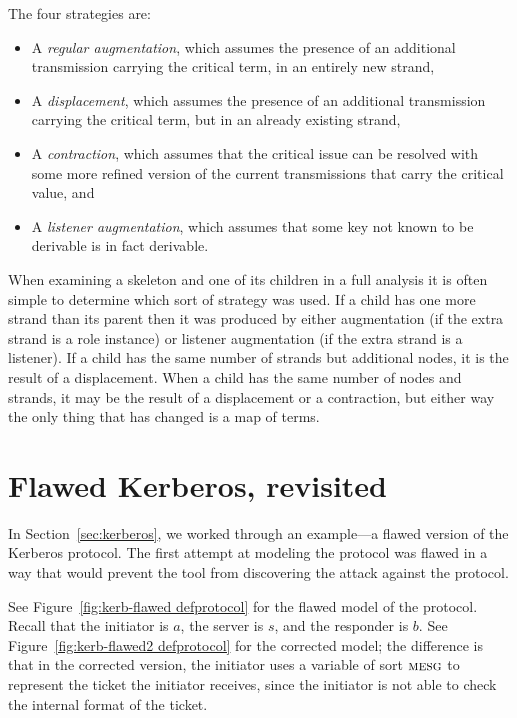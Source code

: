 The four strategies are:

\begin{itemize}

\item A \emph{regular augmentation}, which assumes the presence of an
  additional transmission carrying the critical term, in an entirely
  new strand,

\item A \emph{displacement}, which assumes the presence of an
  additional transmission carrying the critical term, but in an
  already existing strand,

\item A \emph{contraction}, which assumes that the critical issue
  can be resolved with some more refined version of the current
  transmissions that carry the critical value, and

 
\item A \emph{listener augmentation}, which assumes that some key
  not known to be derivable is in fact derivable.

\end{itemize}

When examining a skeleton and one of its children in a full {\cpsa}
analysis it is often simple to determine which sort of strategy was
used.  If a child has one more strand than its parent then it was
produced by either augmentation (if the extra strand is a role
instance) or listener augmentation (if the extra strand is a
listener).  If a child has the same number of strands but additional
nodes, it is the result of a displacement.  When a child has the same
number of nodes and strands, it may be the result of a displacement or
a contraction, but either way the only thing that has changed is a
map of terms.

\section{Flawed Kerberos, revisited}
\label{sec:kerberos2}
In Section~\ref{sec:kerberos}, we worked through an example---a
flawed version of the Kerberos protocol.  The first attempt at
modeling the protocol was flawed in a way that would prevent the tool
from discovering the attack against the protocol.

See Figure~\ref{fig:kerb-flawed defprotocol} for the flawed model of
the protocol.  Recall that the initiator is $a$, the server is $s$,
and the responder is $b$.  See Figure~\ref{fig:kerb-flawed2
  defprotocol} for the corrected model; the difference is that in the
corrected version, the initiator uses a variable of sort $\scap{mesg}$
to represent the ticket the initiator receives, since the initiator is not
able to check the internal format of the ticket.

